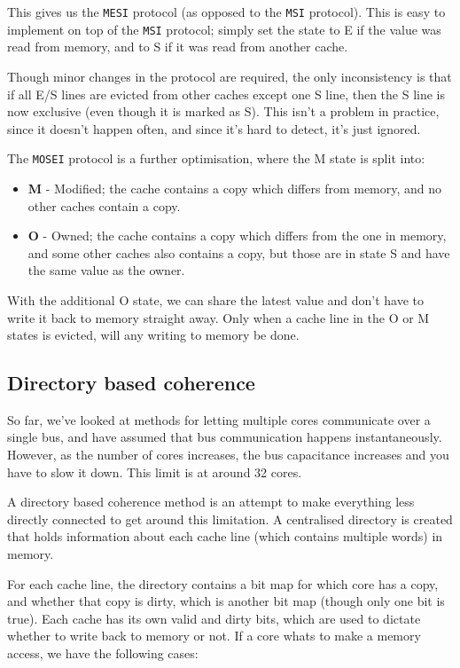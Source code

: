 This gives us the \texttt{MESI} protocol (as opposed to the \texttt{MSI}
protocol). This is easy to implement on top of the \texttt{MSI} protocol; simply
set the state to E if the value was read from memory, and to S if it was read
from another cache.

Though minor changes in the protocol are required, the only inconsistency is
that if all E/S lines are evicted from other caches except one S line, then the
S line is now exclusive (even though it is marked as S). This isn't a problem in
practice, since it doesn't happen often, and since it's hard to detect, it's
just ignored.

The \texttt{MOSEI} protocol is a further optimisation, where the M state is
split into:

\begin{itemize}
  \item \textbf{M} - Modified; the cache contains a copy which differs from 
  memory, and no other caches contain a copy.
  \item \textbf{O} - Owned; the cache contains a copy which differs from the one 
  in memory, and some other caches also contains a copy, but those are in state 
  S and have the same value as the owner.
\end{itemize}

With the additional O state, we can share the latest value and don't have to
write it back to memory straight away. Only when a cache line in the O or M
states is evicted, will any writing to memory be done.

\subsection{Directory based coherence}

So far, we've looked at methods for letting multiple cores communicate over a
single bus, and have assumed that bus communication happens instantaneously.
However, as the number of cores increases, the bus capacitance increases and you
have to slow it down. This limit is at around 32 cores.

A directory based coherence method is an attempt to make everything less
directly connected to get around this limitation. A centralised directory is
created that holds information about each cache line (which contains multiple
words) in memory.

For each cache line, the directory contains a bit map for which core has a copy,
and whether that copy is dirty, which is another bit map (though only one bit is
true). Each cache has its own valid and dirty bits, which are used to dictate
whether to write back to memory or not. If a core whats to make a memory access,
we have the following cases:

